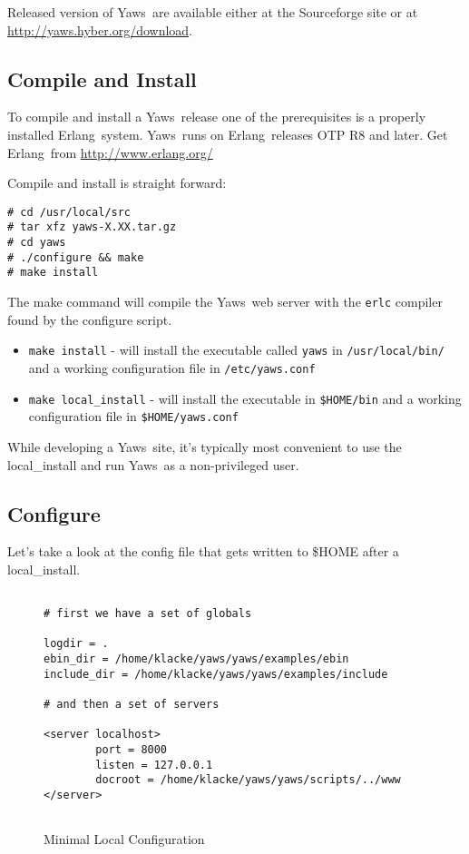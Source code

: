 \documentclass[11pt,oneside,english]{book}
\newcommand{\Erlang}            %
        {{\sc Erlang}}
\newcommand{\Yaws}            %
        {{\sc Yaws}}
\begin{document}
Released version of \Yaws\  are available either at the Sourceforge site or
at \url{http://yaws.hyber.org/download}.



\subsection{Compile and Install}

To compile and install a \Yaws\  release
one of the prerequisites is a properly installed \Erlang\  system. \Yaws\
runs on \Erlang\  releases OTP R8 and later. Get \Erlang\  from
\url{http://www.erlang.org/}

Compile and install is straight forward:
\begin{verbatim}
# cd /usr/local/src
# tar xfz yaws-X.XX.tar.gz
# cd yaws
# ./configure && make
# make install
\end{verbatim}

The make command will compile the \Yaws\  web server with the \verb+erlc+
compiler found by the configure script.

\begin{itemize}

\item  \verb+make install+ - will install the executable called
         \verb+yaws+ in \verb+/usr/local/bin/+ and a working
         configuration file in \verb+/etc/yaws.conf+

\item  \verb+make local_install+ - will install the executable in
         \verb+$HOME/bin+ and a working configuration file in
         \verb+$HOME/yaws.conf+

\end{itemize}

While developing a \Yaws\  site, it's typically most convenient to
use the local\_install and run \Yaws\  as a non-privileged user.


\subsection{Configure}
Let's take a look at the config file that gets written to \$HOME after
a local\_install.


\begin{figure}[h]
\begin{verbatim}

# first we have a set of globals

logdir = .
ebin_dir = /home/klacke/yaws/yaws/examples/ebin
include_dir = /home/klacke/yaws/yaws/examples/include

# and then a set of servers

<server localhost>
        port = 8000
        listen = 127.0.0.1
        docroot = /home/klacke/yaws/yaws/scripts/../www
</server>


\end{verbatim}
\caption{Minimal Local Configuration}
\end{figure}
\end{document}
